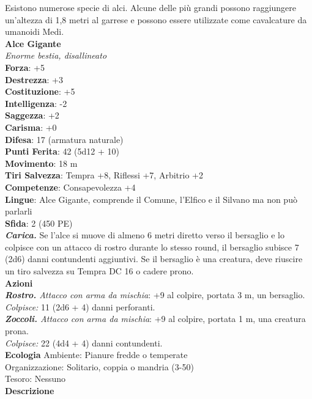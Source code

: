 \begin{multicols}{2}
Esistono numerose specie di alci. Alcune delle più grandi possono raggiungere un'altezza di 1,8 metri al garrese e possono essere utilizzate come cavalcature da umanoidi Medi.\\

\medskip\textbf{Alce Gigante}\\
\emph{Enorme bestia, disallineato}\\
\textbf{Forza}: +5\\
\textbf{Destrezza}: +3\\
\textbf{Costituzione}: +5\\
\textbf{Intelligenza}: -2\\
\textbf{Saggezza}: +2\\
\textbf{Carisma}: +0\\
\textbf{Difesa}: 17 (armatura naturale)\\
\textbf{Punti Ferita}: 42 (5d12 + 10)\\
\textbf{Movimento}: 18 m\\
\textbf{Tiri Salvezza}:  Tempra +8, Riflessi +7, Arbitrio +2\\
\textbf{Competenze}: Consapevolezza +4\\
\textbf{Lingue}: Alce Gigante, comprende il Comune, l'Elfico e il Silvano ma non può parlarli\\
\textbf{Sfida}: 2 (450 PE)\smallskip\\
\emph{\textbf{Carica.}} Se l'alce si muove di almeno 6 metri diretto verso il bersaglio e lo colpisce con un attacco di rostro durante lo stesso round, il bersaglio subisce 7 (2d6) danni contundenti aggiuntivi. Se il bersaglio è una creatura, deve riuscire un tiro salvezza su Tempra DC  16 o cadere prono.\\
\smallskip\textbf{Azioni}\\
\emph{\textbf{Rostro.} Attacco con arma da mischia}: +9 al colpire, portata 3 m, un bersaglio.\\
\emph{Colpisce:} 11 (2d6 + 4) danni perforanti.\\
\emph{\textbf{Zoccoli.} Attacco con arma da mischia}: +9 al colpire, portata 1 m, una creatura prona.\\
\emph{Colpisce:} 22 (4d4 + 4) danni contundenti.\\
\textbf{Ecologia}
Ambiente: Pianure fredde o temperate\\
Organizzazione: Solitario, coppia o mandria (3-50)\\
Tesoro: Nessuno\\
\textbf{Descrizione}

\end{multicols}
